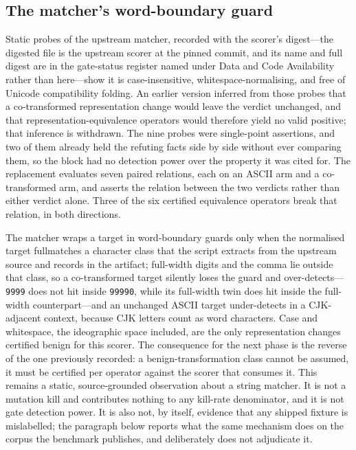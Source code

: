 \documentclass[11pt]{article}
\begin{document}
\subsection{The matcher's word-boundary guard}
Static probes of the upstream matcher, recorded with the scorer's digest---the digested file is the upstream scorer at the pinned commit, and its name and full digest are in the gate-status register named under Data and Code Availability rather than here---show it is case-insensitive, whitespace-normalising, and free of Unicode compatibility folding. An earlier version inferred from those probes that a co-transformed representation change would leave the verdict unchanged, and that representation-equivalence operators would therefore yield no valid positive; that inference is withdrawn. The nine probes were single-point assertions, and two of them already held the refuting facts side by side without ever comparing them, so the block had no detection power over the property it was cited for. The replacement evaluates seven paired relations, each on an ASCII arm and a co-transformed arm, and asserts the relation between the two verdicts rather than either verdict alone. Three of the six certified equivalence operators break that relation, in both directions.

The matcher wraps a target in word-boundary guards only when the normalised target fullmatches a character class that the script extracts from the upstream source and records in the artifact; full-width digits and the comma lie outside that class, so a co-transformed target silently loses the guard and over-detects---\texttt{9999} does not hit inside \texttt{99990}, while its full-width twin does hit inside the full-width counterpart---and an unchanged ASCII target under-detects in a CJK-adjacent context, because CJK letters count as word characters. Case and whitespace, the ideographic space included, are the only representation changes certified benign for this scorer. The consequence for the next phase is the reverse of the one previously recorded: a benign-transformation class cannot be assumed, it must be certified per operator against the scorer that consumes it. This remains a static, source-grounded observation about a string matcher. It is not a mutation kill and contributes nothing to any kill-rate denominator, and it is not gate detection power. It is also not, by itself, evidence that any shipped fixture is mislabelled; the paragraph below reports what the same mechanism does on the corpus the benchmark publishes, and deliberately does not adjudicate it.
\end{document}
